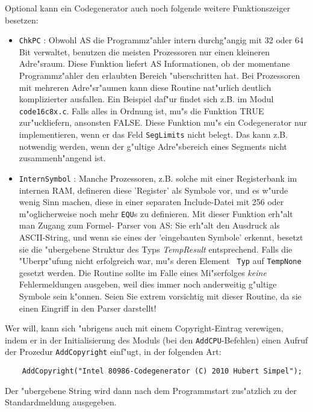 \documentclass[12pt,a4paper,twoside]{report}
\newcommand{\tty}[1]{{\tt #1}}
\begin{document}
{Optional kann ein Codegenerator auch noch folgende weitere Funktionszeiger 
besetzen:
\begin{itemize}
\item{\tty{ChkPC} : Obwohl AS die Programmz"ahler intern durchg"angig mit
      32 oder 64 Bit verwaltet, benutzen die meisten Prozessoren nur einen
      kleineren Adre"sraum.  Diese Funktion liefert AS Informationen, ob
      der momentane Programmz"ahler den erlaubten Bereich "uberschritten
      hat.  Bei Prozessoren mit mehreren Adre"sr"aumen kann diese Routine
      nat"urlich deutlich komplizierter ausfallen.  Ein Beispiel daf"ur
      findet sich z.B. im Modul \tty{code16c8x.c}.  Falls alles in Ordnung ist,
      mu"s die Funktion TRUE zur"uckliefern, ansonsten FALSE.
      Diese Funktion mu"s ein Codegenerator nur implementieren, wenn er
      das Feld {\tt SegLimits} nicht belegt.  Das kann z.B. notwendig
      werden, wenn der g"ultige Adre"sbereich eines Segments nicht 
      zusammenh"angend ist.}
\item{\tty{InternSymbol} : Manche Prozessoren, z.B. solche mit einer 
      Registerbank im internen RAM, defineren diese 'Register' als Symbole
      vor, und es w"urde wenig Sinn machen, diese in einer separaten
      Include-Datei mit 256 oder m"oglicherweise noch mehr {\tt EQU}s
      zu definieren.  Mit dieser Funktion erh"alt man Zugang zum Formel-
      Parser von AS: Sie erh"alt den Ausdruck als ASCII-String, und wenn
      sie eines der 'eingebauten Symbole' erkennt, besetzt sie die
      "ubergebene Struktur des Typs {\em TempResult} entsprechend.  Falls
      die "Uberpr"ufung nicht erfolgreich war, mu"s deren Element {\tt
      Typ} auf {\tt TempNone} gesetzt werden.  Die Routine sollte im
      Falle eines Mi"serfolges {\em keine} Fehlermeldungen ausgeben, weil
      dies immer noch anderweitig g"ultige Symbole sein k"onnen.  Seien
      Sie extrem vorsichtig mit dieser Routine, da sie einen Eingriff in
      den Parser darstellt!}
\end{itemize}

Wer will, kann sich "ubrigens auch mit einem Copyright-Eintrag verewigen,
indem er in der Initialisierung des Moduls (bei den \tty{AddCPU}-Befehlen)
einen Aufruf der Prozedur \tty{AddCopyright} einf"ugt, in der folgenden
Art:
\begin{verbatim}
    AddCopyright("Intel 80986-Codegenerator (C) 2010 Hubert Simpel");
\end{verbatim}
Der "ubergebene String wird dann nach dem Programmstart zus"atzlich zu
der Standardmeldung ausgegeben.

}
\end{document}
